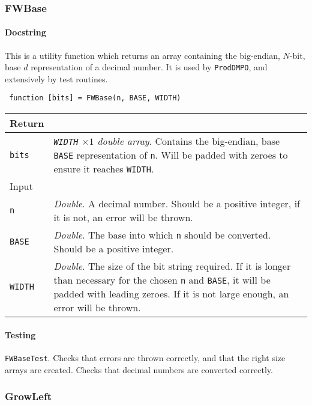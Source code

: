  \subsubsection{FWBase}
 \paragraph{Docstring} This is a utility function which returns an array containing the big-endian, \(N\)-bit, base \(d\) representation of a decimal number. It is used by \lstinline$ProdDMPO$, and extensively by test routines. 
 \begin{lstlisting}
 function [bits] = FWBase(n, BASE, WIDTH) \end{lstlisting}
 \begin{longtabu}{X[1,l]X[4,l]}
 \hline
 Return & \\ \hline
 \lstinline$bits$ & \emph{\lstinline$WIDTH$ \(\times 1\) double array}. Contains the big-endian, base \lstinline$BASE$ representation of \lstinline$n$. Will be padded with zeroes to ensure it reaches \lstinline$WIDTH$. \\ \hline
 Input & \\ \hline
 \lstinline$n$ & \emph{Double}. A decimal number. Should be a positive integer, if it is not, an error will be thrown. \\
 \lstinline$BASE$ & \emph{Double}. The base into which \lstinline$n$ should be converted. Should be a positive integer. \\
 \lstinline$WIDTH$ & \emph{Double}. The size of the bit string required. If it is longer than necessary for the chosen \lstinline$n$ and \lstinline$BASE$, it will be padded with leading zeroes. If it is not large enough, an error will be thrown. \\
 \hline
 \end{longtabu}
 \paragraph{Testing} \lstinline$FWBaseTest$. Checks that errors are thrown correctly, and that the right size arrays are created. Checks that decimal numbers are converted correctly.
 
 \subsubsection{GrowLeft}
